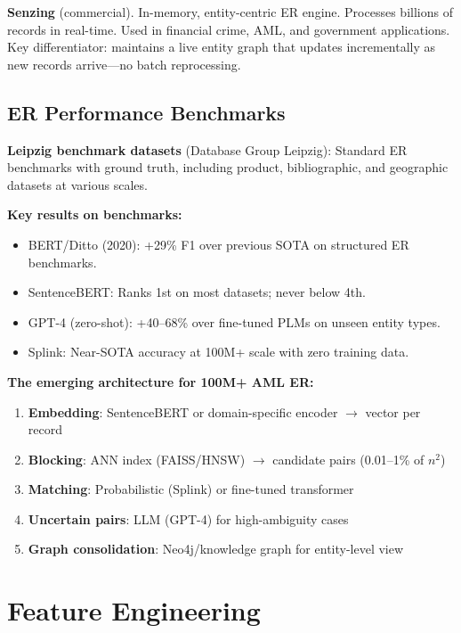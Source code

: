 \documentclass[11pt]{article}
\begin{document}
\textbf{Senzing} (commercial). In-memory, entity-centric ER engine. Processes billions of records in real-time. Used in financial crime, AML, and government applications. Key differentiator: maintains a live entity graph that updates incrementally as new records arrive---no batch reprocessing.

\subsection{ER Performance Benchmarks}

\textbf{Leipzig benchmark datasets} (Database Group Leipzig): Standard ER benchmarks with ground truth, including product, bibliographic, and geographic datasets at various scales.

\textbf{Key results on benchmarks:}
\begin{itemize}
\item BERT/Ditto (2020): +29\% F1 over previous SOTA on structured ER benchmarks.
\item SentenceBERT: Ranks 1st on most datasets; never below 4th.
\item GPT-4 (zero-shot): +40--68\% over fine-tuned PLMs on unseen entity types.
\item Splink: Near-SOTA accuracy at 100M+ scale with zero training data.
\end{itemize}

\textbf{The emerging architecture for 100M+ AML ER:}
\begin{enumerate}
\item \textbf{Embedding}: SentenceBERT or domain-specific encoder $\to$ vector per record
\item \textbf{Blocking}: ANN index (FAISS/HNSW) $\to$ candidate pairs (0.01--1\% of $n^2$)
\item \textbf{Matching}: Probabilistic (Splink) or fine-tuned transformer
\item \textbf{Uncertain pairs}: LLM (GPT-4) for high-ambiguity cases
\item \textbf{Graph consolidation}: Neo4j/knowledge graph for entity-level view
\end{enumerate}

\section{Feature Engineering}
\end{document}
